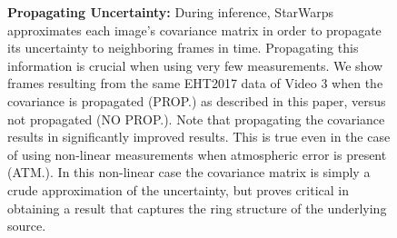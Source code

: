 \begin{figure}[tb]
\begin{center}
\begin{tabular}{   c c | c  c  c   }
			\\ \hline
		\end{tabular}
		\caption{{\bf Propagating Uncertainty:} During inference, StarWarps approximates each image's covariance matrix in order to propagate its uncertainty to neighboring frames in time. Propagating this information is crucial when using very few measurements. We show frames resulting from the same EHT2017 data of Video 3 when the covariance is propagated (PROP.) as described in this paper, versus not propagated (NO PROP.). Note that propagating the covariance results in significantly improved results. This is true even in the case of using non-linear measurements when atmospheric error is present (ATM.). In this non-linear case the covariance matrix is simply a crude approximation of the uncertainty, but proves critical in obtaining a result that captures the ring structure of the underlying source.   }
		\label{fig:propinfo}
	\end{center}
	\vspace{-.3in}
\end{figure}